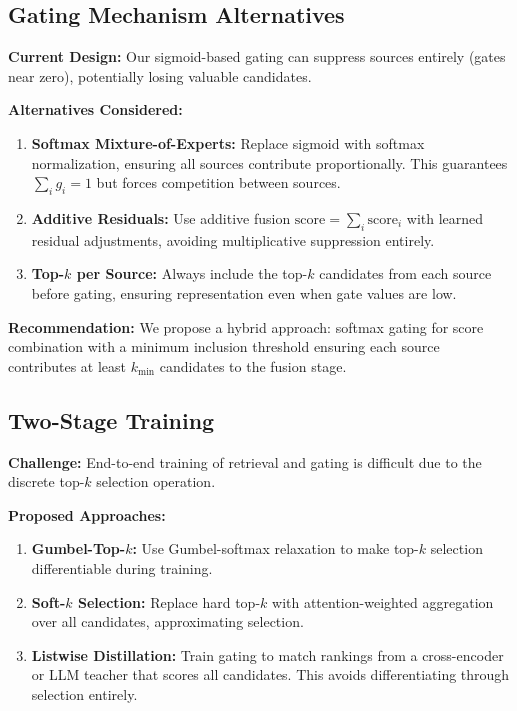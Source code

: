 \documentclass[11pt,a4paper]{article}
\begin{document}
\subsection{Gating Mechanism Alternatives}
\label{sec:gating_alternatives}

\textbf{Current Design:} Our sigmoid-based gating can suppress sources entirely (gates near zero), potentially losing valuable candidates.

\textbf{Alternatives Considered:}
\begin{enumerate}
    \item \textbf{Softmax Mixture-of-Experts:} Replace sigmoid with softmax normalization, ensuring all sources contribute proportionally. This guarantees $\sum_i g_i = 1$ but forces competition between sources.
    
    \item \textbf{Additive Residuals:} Use additive fusion $\text{score} = \sum_i \text{score}_i$ with learned residual adjustments, avoiding multiplicative suppression entirely.
    
    \item \textbf{Top-$k$ per Source:} Always include the top-$k$ candidates from each source before gating, ensuring representation even when gate values are low.
\end{enumerate}

\textbf{Recommendation:} We propose a hybrid approach: softmax gating for score combination with a minimum inclusion threshold ensuring each source contributes at least $k_{\min}$ candidates to the fusion stage.

\subsection{Two-Stage Training}
\label{sec:training}

\textbf{Challenge:} End-to-end training of retrieval and gating is difficult due to the discrete top-$k$ selection operation.

\textbf{Proposed Approaches:}
\begin{enumerate}
    \item \textbf{Gumbel-Top-$k$:} Use Gumbel-softmax relaxation \citep{jang2017categorical} to make top-$k$ selection differentiable during training.
    
    \item \textbf{Soft-$k$ Selection:} Replace hard top-$k$ with attention-weighted aggregation over all candidates, approximating selection.
    
    \item \textbf{Listwise Distillation:} Train gating to match rankings from a cross-encoder or LLM teacher that scores all candidates. This avoids differentiating through selection entirely.
\end{enumerate}
\end{document}
